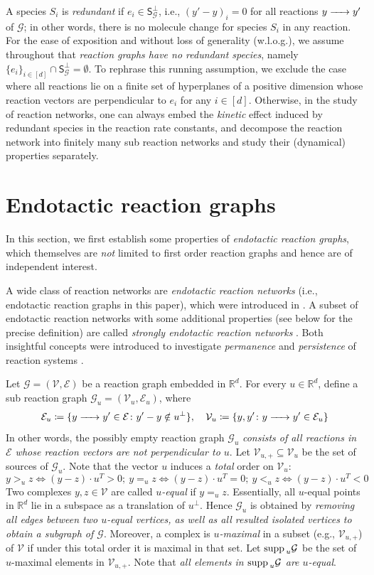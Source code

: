 \documentclass[10pt]{amsart}
\numberwithin{equation}{section}
\theoremstyle{plain}
\theoremstyle{definition}
\theoremstyle{remark}
\newcommand{\cE}{\mathcal{E}}
\newcommand{\cG}{\mathcal{G}}
\newcommand{\cV}{\mathcal{V}}
\newcommand{\supp}{{\rm supp\,}}
\begin{document}
A species $S_i$ is \emph{redundant} if $e_i\in\mathsf{S}^{\perp}_{\cG}$, i.e., $(y'-y)_i=0$ for all reactions $y\ce{->[]} y'$ of $\mathcal{G}$; in other words, there is no molecule change for species $S_i$ in any reaction. For the ease of exposition and without loss of generality (w.l.o.g.), we assume throughout that \emph{reaction graphs have no redundant species}, namely $\{e_i\}_{i\in[d]}\cap\mathsf{S}^{\perp}_{\cG}=\emptyset$. To rephrase this running assumption,  we exclude the case where all reactions lie on a finite set of hyperplanes of a positive dimension whose reaction vectors are perpendicular to $e_i$ for any $i\in[d]$.  Otherwise, in the study of reaction networks, one can always embed the \emph{kinetic} effect induced by redundant species in  the reaction rate constants, and decompose the reaction network into finitely many sub reaction networks and study their (dynamical) properties separately.


\section{Endotactic reaction graphs}\label{sect:endotacticity}
In this section, 
we first establish some properties of  \emph{endotactic reaction graphs}, which themselves are \emph{not} limited to first order reaction graphs and hence are of independent interest.

A wide class of reaction networks are \emph{endotactic reaction networks} (i.e., endotactic reaction graphs in this paper), which were introduced in \cite{CNP13}. A subset of endotactic reaction networks with some additional properties (see below for the precise definition) are called \emph{strongly endotactic reaction networks} \cite{GMS14}. Both insightful concepts were introduced to investigate \emph{permanence} and \emph{persistence} of reaction systems \cite{CNP13,P12,GMS14}.

Let $\cG=(\cV,\cE)$ be a reaction graph embedded in $\mathbb{R}^d$. For every
$u\in\mathbb{R}^d$,  define a sub reaction graph $\cG_u=(\cV_u,\cE_u)$, where $$\mathcal{E}_u\coloneqq\{y\ce{->[]} y'\in\mathcal{E}\colon y'-y\notin u^{\perp}\},\quad \cV_u\coloneqq\{y, y'\colon y\ce{->[]} y'\in\mathcal{E}_u\}$$
 In other words, the possibly empty reaction graph $\cG_u$ \emph{consists of all reactions in $\cE$ whose reaction vectors are not perpendicular to $u$}. Let $\cV_{u,+}\subseteq\cV_u$ be the set of sources of $\cG_u$. Note that the vector $u$ induces a \emph{total} order on $\cV_{u}$: $$y>_u z \iff (y-z)\cdot u^T > 0;\ y=_uz \iff (y-z)\cdot u^T = 0;\ y<_u z \iff (y-z)\cdot u^T < 0$$ Two complexes $y,z\in\cV$ are called \emph{$u$-equal} if $y=_uz$. Essentially, all $u$-equal points in $\mathbb{R}^d$ lie in a subspace as a translation of $u^{\perp}$. Hence  $\cG_u$ is obtained by \emph{removing all edges between two $u$-equal vertices, as well as all resulted isolated vertices to obtain a subgraph of $\cG$}. Moreover, a complex is \emph{$u$-maximal} in a subset (e.g., $\cV_{u,+}$) of $\cV$ if under this total order it is maximal in that set.  Let $\supp_u\cG$ be the set of $u$-maximal elements in $\cV_{u,+}$. Note that \emph{all elements in $\supp_u\cG$ are $u$-equal}.
\end{document}
